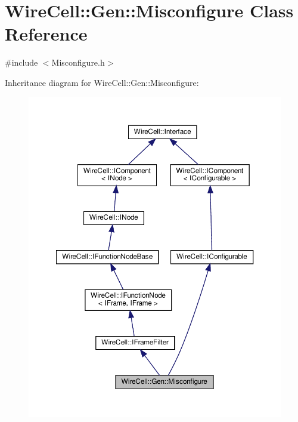 \hypertarget{class_wire_cell_1_1_gen_1_1_misconfigure}{}\section{Wire\+Cell\+:\+:Gen\+:\+:Misconfigure Class Reference}
\label{class_wire_cell_1_1_gen_1_1_misconfigure}


{\ttfamily \#include $<$Misconfigure.\+h$>$}



Inheritance diagram for Wire\+Cell\+:\+:Gen\+:\+:Misconfigure\+:
\nopagebreak
\begin{figure}[H]
\begin{center}
\leavevmode
\includegraphics[width=350pt]{class_wire_cell_1_1_gen_1_1_misconfigure__inherit__graph}
\end{center}
\end{figure}


